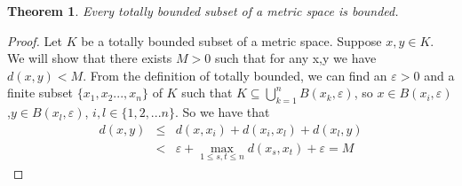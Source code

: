 \documentclass[12pt]{article}
\newtheorem{thm}{Theorem}
\begin{document}
\begin{thm}
Every totally bounded subset of a metric space is bounded.
\end{thm}

\begin{proof}
Let $K$ be a totally bounded subset of a metric space. Suppose $x,y \in K$. We will show that there exists $M>0$ 
such that for any x,y we have $d(x,y)<M$. From the definition of totally bounded, 
we can find an $\varepsilon>0$ and a finite subset $\{x_1,x_2...,x_n\}$
of $K$ such that $K\subseteq \bigcup_{k=1}^n B(x_k,\varepsilon )$, so $x\in B(x_i,\varepsilon )$,$y\in B(x_l,\varepsilon)$, $i,l \in \{1,2,...n\}$. So we have that
\begin{eqnarray*}
d(x,y) & \leq & d(x,x_i)+d(x_i,x_l)+d(x_l,y)\\
       & < & \varepsilon +\max_{1\leq{s,t}\leq n}d(x_s,x_t)+\varepsilon = M
\end{eqnarray*}
\end{proof}
\end{document}
